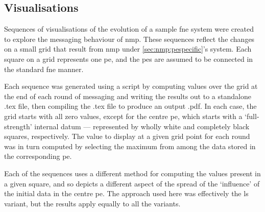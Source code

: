 \subsection{Visualisations}
Sequences of visualisations of the evolution of a sample \gls{fne} system were created to explore the messaging behaviour of \gls{nmp}.  These sequences reflect the changes on a small grid that result from \gls{nmp} under \cref{sec:nmp:pespecific}'s system.  Each square on a grid represents one \gls{pe}, and the \glspl{pe} are assumed to be connected in the standard \gls{fne} manner.

Each sequence was generated using a script by computing values over the grid at the end of each round of messaging and writing the results out to a standalone .tex file, then compiling the .tex file to produce an output .pdf.  In each case, the grid starts with all zero values, except for the centre \gls{pe}, which starts with a `full-strength' internal datum --- represented by wholly white and completely black squares, respectively.  The value to display at a given grid point for each round was in turn computed by selecting the maximum from among the data stored in the corresponding \gls{pe}.

Each of the sequences uses a different method for computing the values present in a given square, and so depicts a different aspect of the spread of the `influence' of the initial data in the centre \gls{pe}.  The approach used here was effectively the \gls{ls} variant, but the results apply equally to all the variants.

